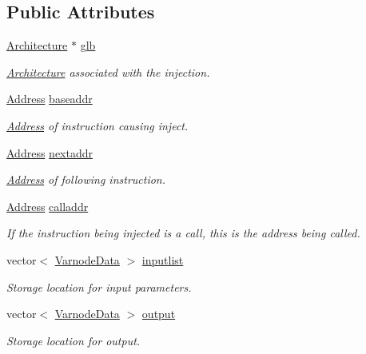 \subsection*{Public Attributes}
\begin{DoxyCompactItemize}
\item 
\mbox{\hyperlink{class_architecture}{Architecture}} $\ast$ \mbox{\hyperlink{class_inject_context_a12f2e51d1fa6e5bc5d5eb88bfc3e0522}{glb}}
\begin{DoxyCompactList}\small\item\em \mbox{\hyperlink{class_architecture}{Architecture}} associated with the injection. \end{DoxyCompactList}\item 
\mbox{\hyperlink{class_address}{Address}} \mbox{\hyperlink{class_inject_context_ab42964a9a9f4ec747a1734b553898ff0}{baseaddr}}
\begin{DoxyCompactList}\small\item\em \mbox{\hyperlink{class_address}{Address}} of instruction causing inject. \end{DoxyCompactList}\item 
\mbox{\hyperlink{class_address}{Address}} \mbox{\hyperlink{class_inject_context_a202c30189f3ea69e9fa7b107809a7691}{nextaddr}}
\begin{DoxyCompactList}\small\item\em \mbox{\hyperlink{class_address}{Address}} of following instruction. \end{DoxyCompactList}\item 
\mbox{\hyperlink{class_address}{Address}} \mbox{\hyperlink{class_inject_context_a472f5669e9817cd95cd91ea36572da1f}{calladdr}}
\begin{DoxyCompactList}\small\item\em If the instruction being injected is a call, this is the address being called. \end{DoxyCompactList}\item 
vector$<$ \mbox{\hyperlink{struct_varnode_data}{Varnode\+Data}} $>$ \mbox{\hyperlink{class_inject_context_af71647d43b614664d77f20747f115702}{inputlist}}
\begin{DoxyCompactList}\small\item\em Storage location for input parameters. \end{DoxyCompactList}\item 
vector$<$ \mbox{\hyperlink{struct_varnode_data}{Varnode\+Data}} $>$ \mbox{\hyperlink{class_inject_context_a9304de2b8553f6bee836cd2ba7cdc187}{output}}
\begin{DoxyCompactList}\small\item\em Storage location for output. \end{DoxyCompactList}\end{DoxyCompactItemize}


